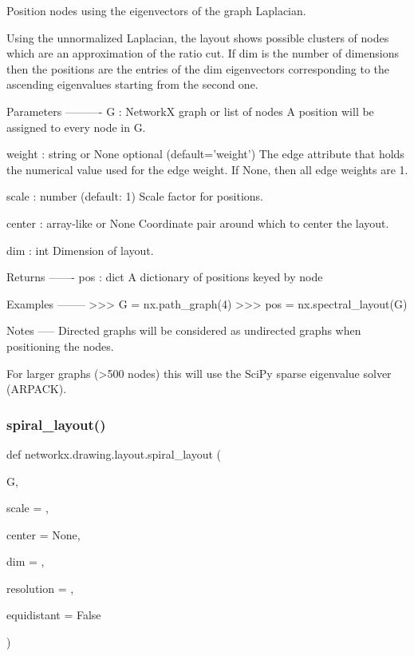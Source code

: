 \begin{DoxyVerb}Position nodes using the eigenvectors of the graph Laplacian.

Using the unnormalized Laplacian, the layout shows possible clusters of
nodes which are an approximation of the ratio cut. If dim is the number of
dimensions then the positions are the entries of the dim eigenvectors
corresponding to the ascending eigenvalues starting from the second one.

Parameters
----------
G : NetworkX graph or list of nodes
    A position will be assigned to every node in G.

weight : string or None   optional (default='weight')
    The edge attribute that holds the numerical value used for
    the edge weight.  If None, then all edge weights are 1.

scale : number (default: 1)
    Scale factor for positions.

center : array-like or None
    Coordinate pair around which to center the layout.

dim : int
    Dimension of layout.

Returns
-------
pos : dict
    A dictionary of positions keyed by node

Examples
--------
>>> G = nx.path_graph(4)
>>> pos = nx.spectral_layout(G)

Notes
-----
Directed graphs will be considered as undirected graphs when
positioning the nodes.

For larger graphs (>500 nodes) this will use the SciPy sparse
eigenvalue solver (ARPACK).
\end{DoxyVerb}
 \mbox{\label{namespacenetworkx_1_1drawing_1_1layout_a3594891dab725686c99df4708e7d01a7}} 
\subsubsection{\texorpdfstring{spiral\+\_\+layout()}{spiral\_layout()}}
{\footnotesize\ttfamily def networkx.\+drawing.\+layout.\+spiral\+\_\+layout (\begin{DoxyParamCaption}\item[{}]{G,  }\item[{}]{scale = {},  }\item[{}]{center = {\ttfamily None},  }\item[{}]{dim = {},  }\item[{}]{resolution = {},  }\item[{}]{equidistant = {\ttfamily False} }\end{DoxyParamCaption})}

